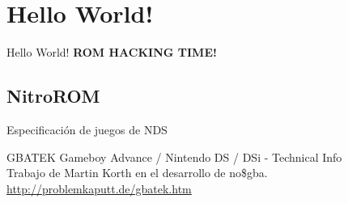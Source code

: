 \section{Hello World!}
\begin{frame}{Hello World!}
    \Huge\centering\textbf{ROM HACKING TIME!}
\end{frame}

\subsection{NitroROM}
\begin{frame}{Especificación de juegos de NDS}
    \begin{block}{GBATEK}
        \centering
         Gameboy Advance / Nintendo DS / DSi - Technical Info \\
         Trabajo de Martin Korth en el desarrollo de no\$gba.
        \url{http://problemkaputt.de/gbatek.htm}
    \end{block}
    \vfill
    \small
    \begin{columns}
    \begin{column}{0.3\textwidth}
    \end{column}
    \begin{column}{0.3\textwidth}
    \end{column}
    \begin{column}{0.3\textwidth}
    \end{column}
    \end{columns}
\end{frame}


